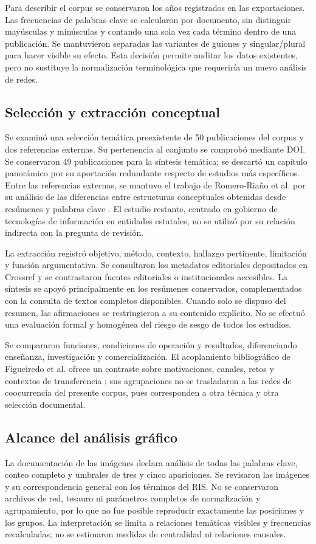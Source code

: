 \documentclass[12pt,twocolumn]{article}
\begin{document}
Para describir el corpus se conservaron los años registrados en las exportaciones. Las frecuencias de palabras clave se calcularon por documento, sin distinguir mayúsculas y minúsculas y contando una sola vez cada término dentro de una publicación. Se mantuvieron separadas las variantes de guiones y singular/plural para hacer visible su efecto. Esta decisión permite auditar los datos existentes, pero no sustituye la normalización terminológica que requeriría un nuevo análisis de redes.

\subsection{Selección y extracción conceptual}
Se examinó una selección temática preexistente de 50 publicaciones del corpus y dos referencias externas. Su pertenencia al conjunto se comprobó mediante DOI. Se conservaron 49 publicaciones para la síntesis temática; se descartó un capítulo panorámico por su aportación redundante respecto de estudios más específicos. Entre las referencias externas, se mantuvo el trabajo de Romero-Riaño et al. por su análisis de las diferencias entre estructuras conceptuales obtenidas desde resúmenes y palabras clave \cite{romeroriano2022}. El estudio restante, centrado en gobierno de tecnologías de información en entidades estatales, no se utilizó por su relación indirecta con la pregunta de revisión.

La extracción registró objetivo, método, contexto, hallazgo pertinente, limitación y función argumentativa. Se consultaron los metadatos editoriales depositados en Crossref y se contrastaron fuentes editoriales o institucionales accesibles. La síntesis se apoyó principalmente en los resúmenes conservados, complementados con la consulta de textos completos disponibles. Cuando solo se dispuso del resumen, las afirmaciones se restringieron a su contenido explícito. No se efectuó una evaluación formal y homogénea del riesgo de sesgo de todos los estudios.

Se compararon funciones, condiciones de operación y resultados, diferenciando enseñanza, investigación y comercialización. El acoplamiento bibliográfico de Figueiredo et al. ofrece un contraste sobre motivaciones, canales, retos y contextos de transferencia \cite{figueiredo2025}; sus agrupaciones no se trasladaron a las redes de coocurrencia del presente corpus, pues corresponden a otra técnica y otra selección documental.

\subsection{Alcance del análisis gráfico}
La documentación de las imágenes declara análisis de todas las palabras clave, conteo completo y umbrales de tres y cinco apariciones. Se revisaron las imágenes y su correspondencia general con los términos del RIS. No se conservaron archivos de red, tesauro ni parámetros completos de normalización y agrupamiento, por lo que no fue posible reproducir exactamente las posiciones y los grupos. La interpretación se limita a relaciones temáticas visibles y frecuencias recalculadas; no se estimaron medidas de centralidad ni relaciones causales.
\end{document}
